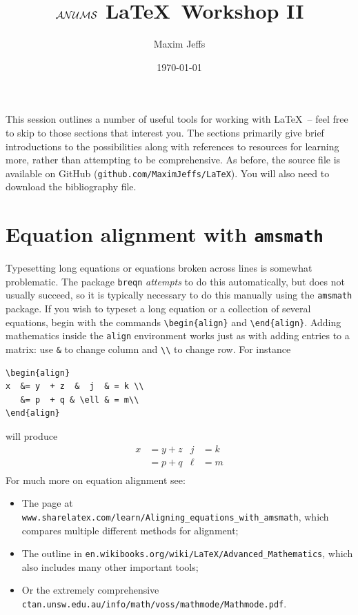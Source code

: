 \documentclass[11pt]{article}
\title{\textbf{$\mathcal{ANUMS}$ \LaTeX\ Workshop II}}
\author{Maxim Jeffs}
\date{\today}
\newcommand{\eqn}[1]{\begin{align*} #1 \end{align*}}
\begin{document}
\maketitle

This session outlines a number of useful tools for working with \LaTeX\ -- feel free to skip to those sections that interest you. The sections primarily give brief introductions to the possibilities along with references to resources for learning more, rather than attempting to be comprehensive. As before, the source file is available on GitHub (\verb$github.com/MaximJeffs/LaTeX$). You will also need to download the bibliography file.

\section{Equation alignment with \texttt{amsmath}}

Typesetting long equations or equations broken across lines is somewhat problematic. The package \texttt{breqn} \textit{attempts} to do this automatically, but does not usually succeed, so it is typically necessary to do this manually using the \verb$amsmath$ package. If you wish to typeset a long equation or a collection of several equations, begin with the commands \verb$\begin{align}$ and \verb$\end{align}$. Adding mathematics inside the \texttt{align} environment works just as with adding entries to a matrix: use \verb$&$ to change column and \verb$\\$ to change row. For instance
\begin{verbatim}
\begin{align}
x  &= y  + z  &  j  & = k \\
   &= p  + q & \ell & = m\\
\end{align}
\end{verbatim}
will produce
\eqn{
x  &= y  + z  &  j  & = k \\
    & = p  + q  & \ell & = m\\
}
For much more on equation alignment see: 
\begin{itemize}
\item The page at \verb$www.sharelatex.com/learn/Aligning_equations_with_amsmath$, which compares multiple different methods for alignment;
\item The outline in \verb$en.wikibooks.org/wiki/LaTeX/Advanced_Mathematics$, which also includes many other important tools;
\item Or the extremely comprehensive \verb$ctan.unsw.edu.au/info/math/voss/mathmode/Mathmode.pdf$. 
\end{itemize} 
\end{document}
